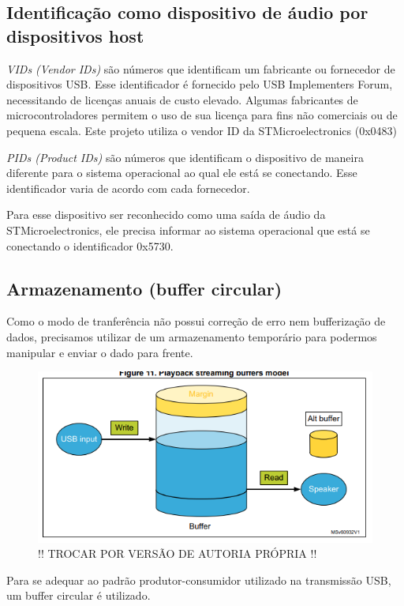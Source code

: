 \subsection{Identificação como dispositivo de áudio por dispositivos host}

\textit{VIDs (Vendor IDs)} são números que identificam um fabricante ou fornecedor de dispositivos USB. Esse identificador é fornecido pelo USB Implementers Forum, necessitando de licenças anuais de custo elevado. Algumas fabricantes de microcontroladores permitem o uso de sua licença para fins não comerciais ou de pequena escala. Este projeto utiliza o vendor ID da STMicroelectronics (0x0483)

\textit{PIDs (Product IDs)} são números que identificam o dispositivo de maneira diferente para o sistema operacional ao qual ele está se conectando. Esse identificador varia de acordo com cada fornecedor.

Para esse dispositivo ser reconhecido como uma saída de áudio da STMicroelectronics, ele precisa informar ao sistema operacional que está se conectando o identificador 0x5730.

\subsection{Armazenamento (buffer circular)}
Como o modo de tranferência não possui correção de erro nem bufferização de dados, precisamos utilizar de um armazenamento temporário para podermos manipular e enviar o dado para frente.
\begin{figure}[!h]
  \includegraphics[scale=0.5]{figuras/circular-buffer.png}
  \caption{!! TROCAR POR VERSÃO DE AUTORIA PRÓPRIA !!}
  \label{fig:circularBuffer}
\end{figure}

Para se adequar ao padrão produtor-consumidor utilizado na transmissão USB, um buffer circular é utilizado. 


